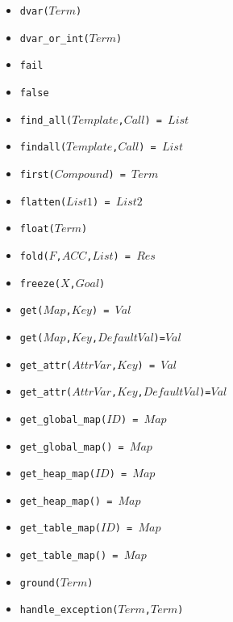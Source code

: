\documentclass[10pt]{article}
\begin{document}
\begin{multicols}{2}
\begin{scriptsize}
\begin{itemize}
    \item \texttt{dvar($Term$)}
    \item \texttt{dvar\_or\_int($Term$)}
    \item \texttt{fail}
    \item \texttt{false}
    \item \texttt{find\_all($Template$,$Call$) = $List$}
    \item \texttt{findall($Template$,$Call$) = $List$}
    \item \texttt{first($Compound$) = $Term$} 
    \item \texttt{flatten($List1$) = $List2$} 
    \item \texttt{float($Term$)} 
    \item \texttt{fold($F$,$ACC$,$List$) = $Res$} 
    \item \texttt{freeze($X$,$Goal$)}
    \item \texttt{get($Map$,$Key$) = $Val$}
    \item \texttt{get($Map$,$Key$,$DefaultVal$)=$Val$} 
    \item \texttt{get\_attr($AttrVar$,$Key$) = $Val$}
    \item \texttt{get\_attr($AttrVar$,$Key$,$DefaultVal$)=$Val$} 
    \item \texttt{get\_global\_map($ID$) = $Map$}
    \item \texttt{get\_global\_map() = $Map$}
    \item \texttt{get\_heap\_map($ID$) = $Map$} 
    \item \texttt{get\_heap\_map() = $Map$} 
    \item \texttt{get\_table\_map($ID$) = $Map$} 
    \item \texttt{get\_table\_map() = $Map$} 
    \item \texttt{ground($Term$)} 
    \item \texttt{handle\_exception($Term$,$Term$)} 

\end{itemize}
\end{scriptsize}
\end{multicols}
\end{document}
